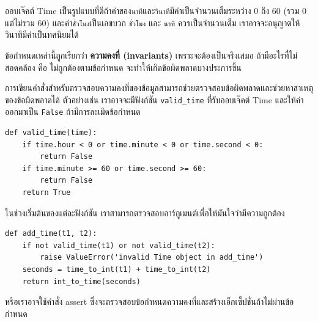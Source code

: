 
ออบเจ๊คต์ Time เป็นรูปแบบที่ดีถ้าค่าของ{\tt นาที}และ{\tt วินาที}มีค่าเป็นจำนวนเต็มระหว่าง 0 ถึง 60 (รวม 0 แต่ไม่รวม 60) และค่า{\tt ชั่วโมง}เป็นเลขบวก 
{\tt ชั่วโมง} และ {\tt นาที} ควรเป็นจำนวนเต็ม เราอาจจะอนุญาตให้วินาทีมีค่าเป็นทศนิยมได้



ข้อกำหนดเหล่านี้ถูกเรียกว่า {\bf ความคงที่ (invariants)} เพราะจะต้องเป็นจริงเสมอ ถ้ามีอะไรที่ไม่สอดคล้อง คือ ไม่ถูกต้องตามข้อกำหนด จะทำให้เกิดข้อผิดพลาดบางประการขึ้น 



การเขียนคำสั่งสำหรับตรวจสอบความคงที่ของข้อมูลสามารถช่วยตรวจสอบข้อผิดพลาดและช่วยหาสาเหตุของข้อผิดพลาดได้ ตัวอย่างเช่น 
เราอาจจะมีฟังก์ชัน \verb"valid_time" ที่รับออบเจ๊คต์ Time และให้ค่าออกมาเป็น {\tt False} ถ้ามีการละเมิดข้อกำหนด


\begin{verbatim}
def valid_time(time):
    if time.hour < 0 or time.minute < 0 or time.second < 0:
        return False
    if time.minute >= 60 or time.second >= 60:
        return False
    return True
\end{verbatim}
%

ในช่วงเริ่มต้นของแต่ละฟังก์ชัน เราสามารถตรวจสอบอาร์กูเมนต์เพื่อให้มันใจว่ามีความถูกต้อง


\begin{verbatim}
def add_time(t1, t2):
    if not valid_time(t1) or not valid_time(t2):
        raise ValueError('invalid Time object in add_time')
    seconds = time_to_int(t1) + time_to_int(t2)
    return int_to_time(seconds)
\end{verbatim}
%
หรือเราอาจใช้คำสั่ง assert ซึ่งจะตรวจสอบข้อกำหนดความคงที่และสร้างเอ็กเซ็ปชั่นถ้าไม่ผ่านข้อกำหนด

